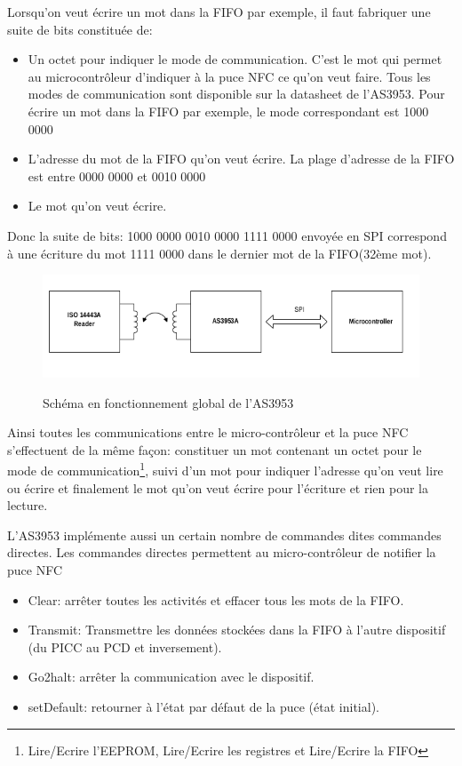 \documentclass{themeensg}
\begin{document}
Lorsqu'on veut écrire un mot dans la FIFO par exemple, il faut fabriquer une suite de bits constituée de:
\begin{itemize}
\item Un octet pour indiquer le mode de communication. C'est le mot qui permet au microcontrôleur d'indiquer à la puce NFC ce qu'on veut faire. Tous les modes de communication sont disponible sur la datasheet de l'AS3953. Pour écrire un mot dans la FIFO par exemple, le mode correspondant est 1000 0000
\item L'adresse du mot de la FIFO qu'on veut écrire. La plage d'adresse de la FIFO est entre 0000 0000 et 0010 0000
\item Le mot qu'on veut écrire.
\end{itemize}
Donc la suite de bits: 1000 0000 0010 0000 1111 0000 envoyée en SPI correspond à une écriture du mot 1111 0000 dans le dernier mot de la FIFO(32ème mot).
\begin{figure}[h!]
\centering
\includegraphics[scale=0.8]{images/blockdiagram.png}
\label{fig:blockdiagram}
\caption{Schéma en fonctionnement global de l'AS3953}
\end{figure}

Ainsi toutes les communications entre le micro-contrôleur et la puce NFC s'effectuent de la même façon: constituer un mot contenant un octet pour le mode de communication\footnote{Lire/Ecrire l'EEPROM, Lire/Ecrire les registres et Lire/Ecrire la FIFO}, suivi d'un mot pour indiquer l'adresse qu'on veut lire ou écrire et finalement le mot qu'on veut écrire pour l'écriture et rien pour la lecture.

L'AS3953 implémente aussi un certain nombre de commandes dites commandes directes. Les commandes directes permettent au micro-contrôleur de notifier la puce NFC

\begin{itemize}
\item Clear: arrêter toutes les activités et effacer tous les mots de la FIFO.
\item Transmit: Transmettre les données stockées dans la FIFO à l'autre dispositif (du PICC au PCD et inversement).
\item Go2halt: arrêter la communication avec le dispositif.
\item setDefault: retourner à l'état par défaut de la puce (état initial).
\end{itemize}
\end{document}
